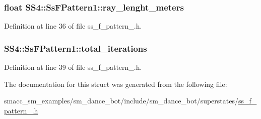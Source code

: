 \subsubsection[{\texorpdfstring{ray\+\_\+lenght\+\_\+meters}{ray_lenght_meters}}]{\setlength{\rightskip}{0pt plus 5cm}float S\+S4\+::\+Ss\+F\+Pattern1\+::ray\+\_\+lenght\+\_\+meters}\hypertarget{structSS4_1_1SsFPattern1_a72803a7a7ce8025ee7aa36726f3aaefc}{}\label{structSS4_1_1SsFPattern1_a72803a7a7ce8025ee7aa36726f3aaefc}


Definition at line 36 of file ss\+\_\+f\+\_\+pattern\+\_.\+h.

\subsubsection[{\texorpdfstring{total\+\_\+iterations}{total_iterations}}]{ S\+S4\+::\+Ss\+F\+Pattern1\+::total\+\_\+iterations}\hypertarget{structSS4_1_1SsFPattern1_ac7c81f3b8a44de58fad91a7be3af03c0}{}\label{structSS4_1_1SsFPattern1_ac7c81f3b8a44de58fad91a7be3af03c0}


Definition at line 39 of file ss\+\_\+f\+\_\+pattern\+\_.\+h.



The documentation for this struct was generated from the following file\+:\begin{DoxyCompactItemize}
\item 
smacc\+\_\+sm\+\_\+examples/sm\+\_\+dance\+\_\+bot/include/sm\+\_\+dance\+\_\+bot/superstates/\hyperlink{ss__f__pattern__1_8h}{ss\+\_\+f\+\_\+pattern\+\_.\+h}\end{DoxyCompactItemize}
